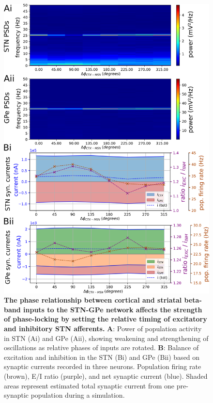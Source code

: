 \begin{figure}
\centering
\includegraphics[height=\dimexpr \textheight - 10\baselineskip\relax]{ch_detailed_model/figs_split/fig_exogenous_sweep-ctx-msn-phase_A-psd-currents.png}
\caption{
\textbf{The phase relationship between cortical and striatal beta-band inputs to the STN-GPe network affects the strength of phase-locking by setting the relative timing of excitatory and inhibitory STN afferents.}
\textbf{A}: Power of population activity in STN (Ai) and GPe (Aii), showing weakening and strengthening of oscillations as relative phases of inputs are rotated.
\textbf{B}: Balance of excitation and inhibition in the STN (Bi) and GPe (Bii) based on synaptic currents recorded in three neurons. Population firing rate (brown), E/I ratio (purple), and net synaptic current (blue). Shaded areas represent estimated total synaptic current from one pre-synaptic population during a simulation.
}
\label{fig:exogenous_sweep-ctx-msn-phase_A-psd-currents}
\end{figure}

